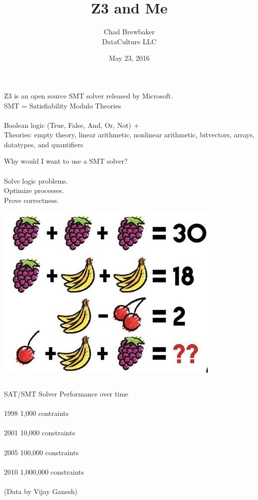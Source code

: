 \documentclass{beamer}
\title{Z3 and Me}
\author{Chad Brewbaker\\ DataCulture LLC}
\date{May 23, 2016}
\begin{document}
\frame{\titlepage}


\begin{frame}[fragile]
Z3 is an open source SMT solver released by Microsoft.\\
SMT = Satisfiability Modulo Theories\\
\\
Boolean logic (True, False, And, Or, Not) +\\
Theories: empty theory, linear arithmetic, nonlinear arithmetic, bitvectors, arrays, datatypes, and quantifiers
\end{frame}


\begin{frame}[fragile]
Why would I want to use a SMT solver?\\
\\
Solve logic problems.\\
Optimize processes.\\
Prove correctness.\\
\end{frame}

\begin{frame}[fragile]
\includegraphics[scale=0.5]{spuzzle}
\end{frame}

\begin{frame}[fragile]
\inputminted{Python}{silly.py}

\end{frame}


\begin{frame}[fragile]
SAT/SMT Solver Performance over time\\\\
1998 1,000 contraints\\\\
2001 10,000 constraints\\\\
2005 100,000 constraints\\\\
2010 1,000,000 constraints\\\\
(Data by Vijay Ganesh)
\end{frame}
\end{document}
